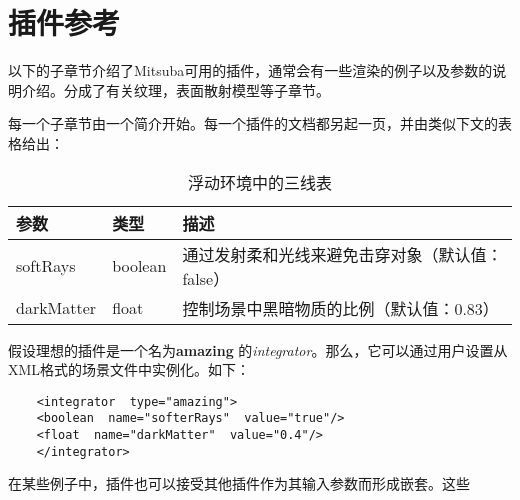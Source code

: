 \chapter{插件参考}
以下的子章节介绍了Mitsuba可用的插件，通常会有一些渲染的例子以及参数的说明介绍。分成了有关纹理，表面散射模型等子章节。
\par 
每一个子章节由一个简介开始。每一个插件的文档都另起一页，并由类似下文的表格给出：
\begin{table}[htbp]
\caption{浮动环境中的三线表}
\label{tab:threesome}
\centering
\begin{tabular}{lll}
	\hline
	\textbf{参数} & \textbf{类型}  & \textbf{描述} \\
	\hline
	softRays & boolean & 通过发射柔和光线来避免击穿对象（默认值：false） \\
	darkMatter & float & 控制场景中黑暗物质的比例（默认值：0.83） \\
	\hline
\end{tabular}
\end{table}
\par 
假设理想的插件是一个名为\textbf{amazing} 的\textit{integrator}。那么，它可以通过用户设置从XML格式的场景文件中实例化。如下：
\begin{lstlisting}
	<integrator  type="amazing">
	<boolean  name="softerRays"  value="true"/>
	<float  name="darkMatter"  value="0.4"/>
	</integrator>
\end{lstlisting}
\par 
在某些例子中，插件也可以接受其他插件作为其输入参数而形成嵌套。这些